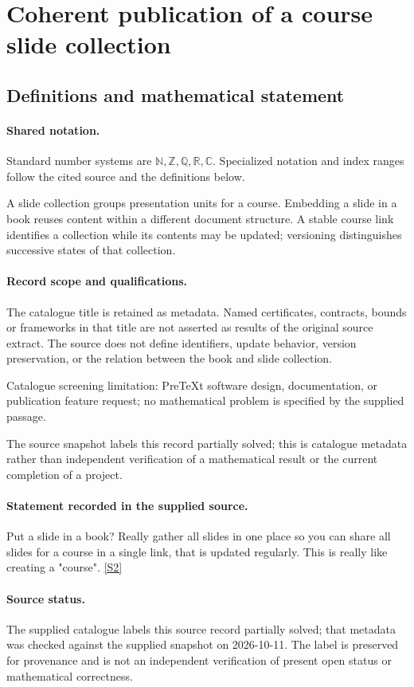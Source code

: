 \documentclass[11pt]{article}
\newcommand{\sref}[2]{\hyperlink{source:#1:#2}{[S#2]}}
\begin{document}
\section{Coherent publication of a course slide collection}\label{statement}

\subsection{Definitions and mathematical statement}

\paragraph{Shared notation.}Standard number systems are $\mathbb N,\mathbb Z,\mathbb Q,\mathbb R,\mathbb C$. Specialized notation and index ranges follow the cited source and the definitions below.


A slide collection groups presentation units for a course. Embedding a slide in a book reuses content within a different document structure. A stable course link identifies a collection while its contents may be updated; versioning distinguishes successive states of that collection.
\paragraph{Record scope and qualifications.}
The catalogue title is retained as metadata. Named certificates, contracts, bounds or frameworks in that title are not asserted as results of the original source extract.
The source does not define identifiers, update behavior, version preservation, or the relation between the book and slide collection.

Catalogue screening limitation: PreTeXt software design, documentation, or publication feature request; no mathematical problem is specified by the supplied passage.

The source snapshot labels this record partially solved; this is catalogue metadata rather than independent verification of a mathematical result or the current completion of a project.
\paragraph{Statement recorded in the supplied source.}
Put a slide in a book? Really gather all slides in one place so you can share all slides for a course in a single link, that is updated regularly. This is really like creating a "course". \sref{statement}{2}
\paragraph{Source status.}
The supplied catalogue labels this source record partially solved; that metadata was checked against the supplied snapshot on 2026-10-11. The label is preserved for provenance and is not an independent verification of present open status or mathematical correctness.
\end{document}
